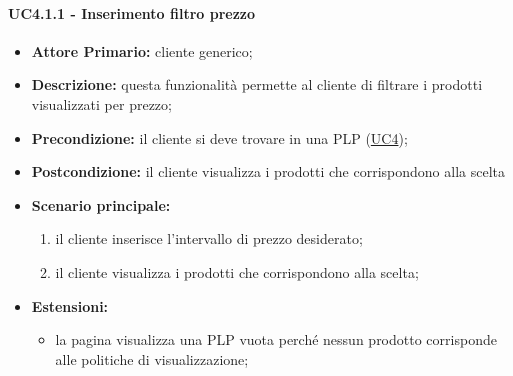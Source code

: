 \paragraph{UC4.1.1 - Inserimento filtro prezzo}
\label{UC4.1.1}
\begin{itemize}
    \item \textbf{Attore Primario:} cliente generico;
    \item \textbf{Descrizione:} questa funzionalità permette al cliente di filtrare i prodotti visualizzati per prezzo;
    \item \textbf{Precondizione:} il cliente si deve trovare in una PLP (\hyperref[UC4]{UC4});
    \item \textbf{Postcondizione:} il cliente visualizza i prodotti che corrispondono alla scelta
    \item \textbf{Scenario principale:}
    \begin{enumerate}
        \item il cliente inserisce l'intervallo di prezzo desiderato;
        \item il cliente visualizza i prodotti che corrispondono alla scelta;
    \end{enumerate}
    \item \textbf{Estensioni:}
    \begin{itemize}
        \item la pagina visualizza una PLP vuota perché nessun prodotto corrisponde alle politiche di visualizzazione;
    \end{itemize}
\end{itemize}

